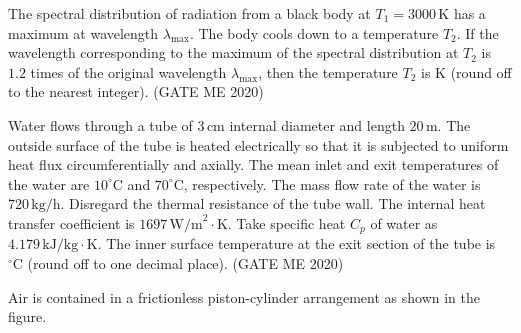 \item
The spectral distribution of radiation from a black body at $T_1 = 3000 \, \text{K}$ has a maximum at wavelength $\lambda_{\text{max}}$. The body cools down to a temperature $T_2$. If the wavelength corresponding to the maximum of the spectral distribution at $T_2$ is $1.2$ times of the original wavelength $\lambda_{\text{max}}$, then the temperature $T_2$ is \underline{\hspace{3cm}} K (round off to the nearest integer). \hfill (GATE ME 2020)

\item
Water flows through a tube of $3 \, \text{cm}$ internal diameter and length $20 \, \text{m}$. The outside surface of the tube is heated electrically so that it is subjected to uniform heat flux circumferentially and axially. The mean inlet and exit temperatures of the water are $10^\circ \text{C}$ and $70^\circ \text{C}$, respectively. The mass flow rate of the water is $720 \, \text{kg/h}$. Disregard the thermal resistance of the tube wall. The internal heat transfer coefficient is $1697 \, \text{W/m}^2\cdot\text{K}$. Take specific heat $C_p$ of water as $4.179 \, \text{kJ/kg}\cdot\text{K}$. The inner surface temperature at the exit section of the tube is \underline{\hspace{3cm}} $^\circ \text{C}$ (round off to one decimal place). \hfill (GATE ME 2020)

\item
Air is contained in a frictionless piston-cylinder arrangement as shown in the figure.

\begin{center}    
%
\end{center}


